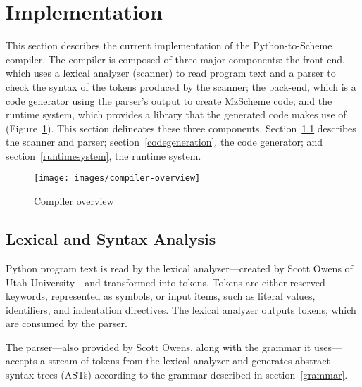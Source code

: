 
\section{Implementation}
\label{implementation}

This section describes the current implementation of the Python-to-Scheme compiler.  The compiler is composed of three major components: the front-end, which uses a lexical analyzer (scanner) to read program text and a parser to check the syntax of the tokens produced by the scanner; the back-end, which is a code generator using the parser's output to create MzScheme code; and the runtime system, which provides a library that the generated code makes use of (Figure~\ref{compilerfig}).  This section delineates these three components.  Section~\ref{parsing} describes the scanner and parser; section~\ref{codegeneration}, the code generator; and section~\ref{runtimesystem}, the runtime system.

\begin{figure}
	\caption{Compiler overview}
	\label{compilerfig}
	\begin{center}
		\texttt{[image: images/compiler-overview]}
	\end{center}
\end{figure}

\subsection{Lexical and Syntax Analysis}
\label{parsing}

Python program text is read by the lexical analyzer---created by Scott Owens of Utah University---and transformed into tokens.  Tokens are either reserved keywords, represented as symbols, or input items, such as literal values, identifiers, and indentation directives.  The lexical analyzer outputs tokens, which are consumed by the parser.

The parser---also provided by Scott Owens, along with the grammar it uses---accepts a stream of tokens from the lexical analyzer and generates abstract syntax trees (ASTs) according to the grammar described in section~\ref{grammar}.

